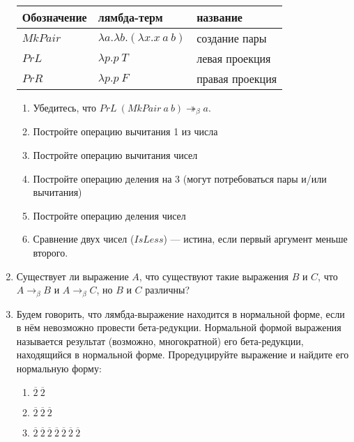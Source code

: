 \documentclass[10pt,a4paper,oneside]{article}
\begin{document}
\begin{enumerate}
\begin{tabular}{lll}
Обозначение & лямбда-терм & название\\\hline
$MkPair$ & $\lambda a.\lambda b.(\lambda x.x\ a\ b)$ & создание пары\\
$PrL$ & $\lambda p.p\ T$ & левая проекция\\
$PrR$ & $\lambda p.p\ F$ & правая проекция\\\hline
\end{tabular}

\begin{enumerate}
\item Убедитесь, что $PrL\ (MkPair\ a\ b) \twoheadrightarrow_\beta a$.
\item Постройте операцию вычитания 1 из числа
\item Постройте операцию вычитания чисел
\item Постройте операцию деления на 3 (могут потребоваться пары и/или вычитания)
\item Постройте операцию деления чисел
\item Сравнение двух чисел ($IsLess$) — истина, если первый аргумент меньше второго.
\end{enumerate}

\item Существует ли выражение $A$, что существуют такие выражения $B$ и $C$, что
$A \rightarrow_\beta B$ и $A \rightarrow_\beta C$, но $B$ и $C$ различны?

\item Будем говорить, что лямбда-выражение находится в нормальной форме, если в нём невозможно
провести бета-редукции. Нормальной формой выражения называется результат (возможно, многократной)
его бета-редукции, находящийся в нормальной форме. 
Проредуцируйте выражение и найдите его нормальную форму: 
\begin{enumerate}
\item $\overline{2}\ \overline{2}$
\item $\overline{2}\ \overline{2}\ \overline{2}$
\item $\overline{2}\ \overline{2}\ \overline{2}\ \overline{2}\ \overline{2}\ \overline{2}\ \overline{2}$
\end{enumerate}


\end{enumerate}
\end{document}
